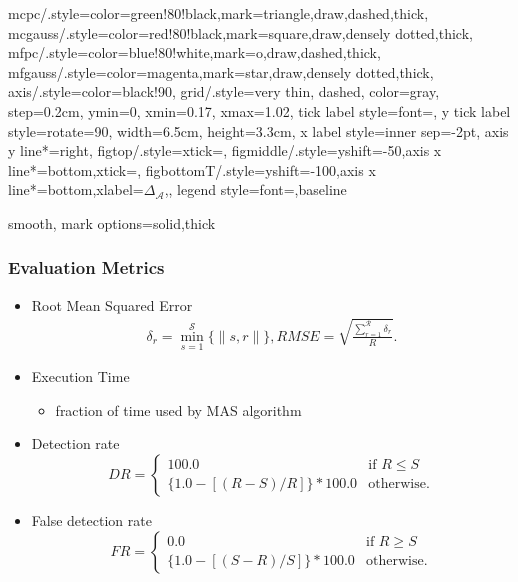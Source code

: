 \pgfplotsset
{
	mcpc/.style={color=green!80!black,mark=triangle,draw,dashed,thick},
	mcgauss/.style={color=red!80!black,mark=square,draw,densely dotted,thick},
	mfpc/.style={color=blue!80!white,mark=o,draw,dashed,thick},
	mfgauss/.style={color=magenta,mark=star,draw,densely dotted,thick},
	axis/.style={color=black!90},
	grid/.style={very thin, dashed, color=gray, step=0.2cm},
	ymin=0,
	xmin=0.17,
	xmax=1.02,
	tick label style={font=\tiny},
	y tick label style={rotate=90},
	width=6.5cm,
	height=3.3cm,
	x label style={inner sep=-2pt},
	axis y line*=right,
	figtop/.style={xtick=\empty},
	figmiddle/.style={yshift=-50,axis x line*=bottom,xtick=\empty},
	figbottomT/.style={yshift=-100,axis x line*=bottom,xlabel=\scriptsize{$\Delta_{\mathcal{A}}$},},
	legend style={font=\tiny,baseline}
}

\tikzset
{
	smooth,
	mark options={solid,thick}
}

\begin{frame}
	\frametitle{Evaluation Metrics}
		\begin{itemize}
			\item Root Mean Squared Error
				\begin{eqnarray*}
					\delta_r = \min_{s = 1}^{\mathcal{S}} \{\|s,r\|\},
					RMSE = \sqrt{\frac{\sum_{r = 1}^{\mathcal{R}} \delta_r}{R}}.
				\end{eqnarray*}
				
				\item Execution Time
					\begin{itemize}
						\item fraction of time used by MAS algorithm
					\end{itemize}
				\item Detection rate
					\begin{displaymath}
						DR =
						\left\{
							\begin{array}{rl}
								100.0 & \mbox{if } R \leq S \\
								\{1.0 - [(R - S) / R]\} * 100.0 & \mbox{otherwise}.
							\end{array}
						\right.
					\end{displaymath}
				\item False detection rate
					\begin{displaymath}
						FR =
						\left\{
							\begin{array}{rl}
								0.0 & \mbox{if } R \geq S \\
								\{1.0 - [(S - R) / S]\} * 100.0 & \mbox{otherwise}.
							\end{array}
						\right.
					\end{displaymath}
		\end{itemize}
\end{frame}

